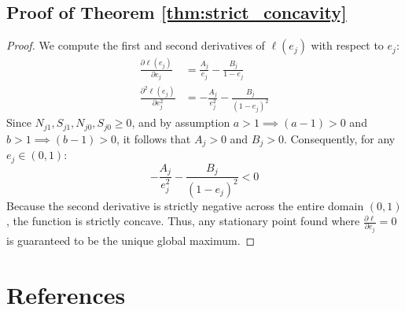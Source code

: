 \documentclass[11pt,a4paper]{article}
\begin{document}
\subsection{Proof of Theorem \ref{thm:strict_concavity}} \label{app:proof_strict_concavity}
\begin{proof}
We compute the first and second derivatives of $\ell(e_j)$ with respect to $e_j$:
\begin{align}
    \frac{\partial \ell(e_j)}{\partial e_j} &= \frac{A_j}{e_j} - \frac{B_j}{1 - e_j} \\
    \frac{\partial^2 \ell(e_j)}{\partial e_j^2} &= -\frac{A_j}{e_j^2} - \frac{B_j}{(1 - e_j)^2}
\end{align}
Since $N_{j1}, S_{j1}, N_{j0}, S_{j0} \ge 0$, and by assumption 
$a > 1 \implies (a-1) > 0$ and $b > 1 \implies (b-1) > 0$, 
it follows that $A_j > 0$ and $B_j > 0$. 
Consequently, for any $e_j \in (0, 1)$:
\begin{equation}
    -\frac{A_j}{e_j^2} - \frac{B_j}{(1 - e_j)^2} < 0
\end{equation}
Because the second derivative is strictly negative across the 
entire domain $(0,1)$, the function is strictly concave. 
Thus, any stationary point found where $\frac{\partial \ell}{\partial e_j} = 0$ 
is guaranteed to be the unique global maximum.
\end{proof}




\newpage
\section{References}
 
\end{document}
